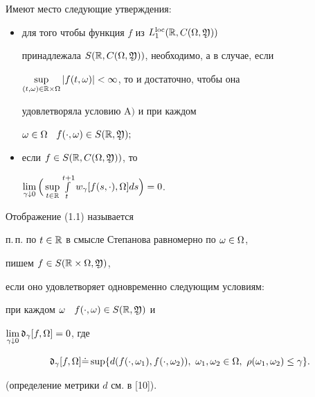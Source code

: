 \begin{lems}


Имеют место следующие утверждения\/$:$


\begin{itemize}


\item[1)] для того чтобы функция $f$ из $L_{1}^{\operatorname{loc}}(\Bbb R,C(\Omega,\frak Y))$


принадлежала $S(\Bbb R,C(\Omega,\frak Y))$, необходимо, а в случае, если


$\sup\limits_{(t,\omega)\in\Bbb R\times\Omega}|f(t,\omega)|<\infty$, то и достаточно, чтобы она


удовлетворяла условию $\mathrm A)$ и при каждом


$\omega\in\Omega$ \ $f(\cdot,\omega)\in S(\Bbb R,\frak Y);$


\item[2)] если $f\in S(\Bbb R,C(\Omega,\frak Y))$, то


$\lim\lt_{\gamma\downarrow 0}\Big(


\sup\lt_{t\in\R}\int\lt_{t}^{t+1}w_{\gamma}[f(s,\cdot),\Om]ds\Big)=0$.


\end{itemize}


\end{lems}





\begin{defns}


Отображение (1.1) называется


п.\,п. по $t\in\Bbb R$ в смысле Степанова равномерно по $\omega\in\Omega$,


пишем $f\in S(\Bbb R\times\Omega,\frak Y)$,


если оно удовлетворяет одновременно следующим условиям:


при каждом $\omega$ \ $f(\cdot,\omega)\in S(\Bbb R,\frak Y)$ и


$\lim\limits_{\gamma\downarrow 0}\frak d_{\gamma}[f,\Omega]=0$, где


\begin{equation}


\frak d_{\gamma}[f,\Om]\Dot =


\sup\{d(f(\cdot,\om_1),f(\cdot,\om_2)),


\ \om_1,\om_2 \in\Om,\ \rho(\om_1,\om_2)\le \gamma\}.


\end{equation}


(определение метрики $d$ см. в [10]).


\end{defns}






